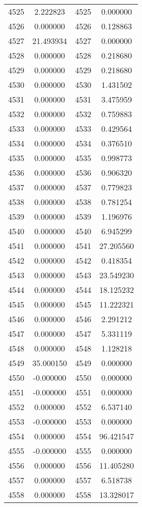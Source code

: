 \documentclass[12pt]{article}
\begin{document}
\begin{longtable}{@{}cccc@{}}
4525 & 2.222823 & 4525 & 0.000000 \\
4526 & 0.000000 & 4526 & 0.128863 \\
4527 & 21.493934 & 4527 & 0.000000 \\
4528 & 0.000000 & 4528 & 0.218680 \\
4529 & 0.000000 & 4529 & 0.218680 \\
4530 & 0.000000 & 4530 & 1.431502 \\
4531 & 0.000000 & 4531 & 3.475959 \\
4532 & 0.000000 & 4532 & 0.759883 \\
4533 & 0.000000 & 4533 & 0.429564 \\
4534 & 0.000000 & 4534 & 0.376510 \\
4535 & 0.000000 & 4535 & 0.998773 \\
4536 & 0.000000 & 4536 & 0.906320 \\
4537 & 0.000000 & 4537 & 0.779823 \\
4538 & 0.000000 & 4538 & 0.781254 \\
4539 & 0.000000 & 4539 & 1.196976 \\
4540 & 0.000000 & 4540 & 6.945299 \\
4541 & 0.000000 & 4541 & 27.205560 \\
4542 & 0.000000 & 4542 & 0.418354 \\
4543 & 0.000000 & 4543 & 23.549230 \\
4544 & 0.000000 & 4544 & 18.125232 \\
4545 & 0.000000 & 4545 & 11.222321 \\
4546 & 0.000000 & 4546 & 2.291212 \\
4547 & 0.000000 & 4547 & 5.331119 \\
4548 & 0.000000 & 4548 & 1.128218 \\
4549 & 35.000150 & 4549 & 0.000000 \\
4550 & -0.000000 & 4550 & 0.000000 \\
4551 & -0.000000 & 4551 & 0.000000 \\
4552 & 0.000000 & 4552 & 6.537140 \\
4553 & -0.000000 & 4553 & 0.000000 \\
4554 & 0.000000 & 4554 & 96.421547 \\
4555 & -0.000000 & 4555 & 0.000000 \\
4556 & 0.000000 & 4556 & 11.405280 \\
4557 & 0.000000 & 4557 & 6.518738 \\
4558 & 0.000000 & 4558 & 13.328017 \\

\end{longtable}
\end{document}
